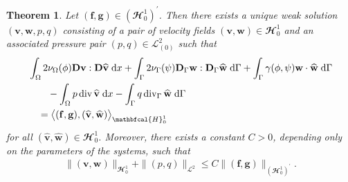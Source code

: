 \documentclass[10pt,reqno]{amsart}
\newtheorem{theorem}{Theorem}[section]
\theoremstyle{remark}
\numberwithin{equation}{section}
\newcommand{\norm}[1]{\| #1 \|}
\newcommand{\bv}{\mathbf{v}}
\newcommand{\bw}{\mathbf{w}}
\newcommand{\ww}{\widehat{\bw}}
\newcommand{\wv}{\widehat{\bv}}
\newcommand{\D}{\mathbf{D}}
\newcommand{\f}{\mathbf{f}}
\newcommand{\g}{\mathbf{g}}
\newcommand{\Dg}{\mathbf{D}_\Gamma}
\newcommand{\intO}{\int_\Omega}
\newcommand{\intG}{\int_\Gamma}
\newcommand{\dx}{\;\mathrm{d}x}
\newcommand{\dG}{\;\mathrm d\Ga}
\newcommand{\Div}{\textnormal{div}}
\newcommand{\Divg}{\textnormal{div}_\Ga}
\newcommand{\Om}{\Omega}
\newcommand{\Ga}{\Gamma}
\begin{document}
\begin{theorem}\label{App:Lemma:BulkSurfaceStokes:WS}
    Let $(\f,\g)\in(\mathbfcal{H}^1_0)^\prime$. Then there exists a unique weak solution $(\bv,\bw,p,q)$ consisting of a pair of velocity fields $(\bv,\bw)\in\mathbfcal{H}^1_0$ and an associated pressure pair $(p,q)\in\mathcal{L}^2_{(0)}$ such that
    \begin{align*}
        &\intO 2\nu_\Om(\phi)\D\bv:\D\wv\dx + \intG 2\nu_\Ga(\psi)\Dg\bw:\Dg\ww\dG + \intG \gamma(\phi,\psi)\bw\cdot\ww\dG \nonumber \\
        &\qquad - \intO p\,\Div\,\wv\dx - \intG q\,\Divg\,\ww\dG \\
        &\quad = \big\langle (\f,\g),(\wv,\ww)\big\rangle_{\mathbfcal{H}^1_0} \nonumber
    \end{align*}
    for all $(\wv,\ww)\in\mathbfcal{H}^1_0$. Moreover, there exists a constant $C > 0$, depending only on the parameters of the systems, such that
    \begin{align}\label{App:Est:BulkSurfaceStokes:H^1}
        \norm{(\bv,\bw)}_{\mathbfcal{H}^1_0} + \norm{(p,q)}_{\mathcal{L}^2} \leq C\norm{(\f,\g)}_{(\mathbfcal{H}^1_0)^\prime}.
    \end{align}
\end{theorem}
\end{document}
